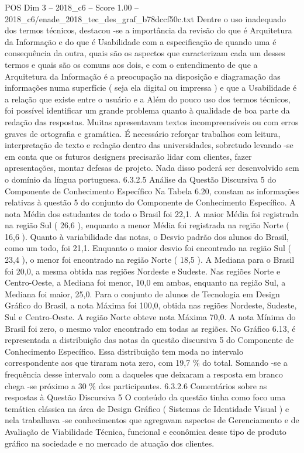 \begin{textsample}{POS Dim 3 – 2018\_c6 – Score 1.00 – 2018\_c6/enade\_2018\_tec\_des\_graf\_b78dccf50c.txt}
Dentre o uso inadequado dos termos técnicos, destacou -se a importância da revisão do que é Arquitetura da Informação e do que é Usabilidade com a especificação de quando uma é consequência da outra, quais são os aspectos que caracterizam cada um desses termos e quais são os comuns aos dois, e com o entendimento de que a Arquitetura da Informação é a preocupação na disposição e diagramação das informações numa superfície ( seja ela digital ou impressa ) e que a Usabilidade é a relação que existe entre o usuário e a Além do pouco uso dos termos técnicos, foi possível identificar um grande problema quanto à qualidade de boa parte da redação das respostas.
Muitas apresentavam textos incompreensíveis ou com erros graves de ortografia e gramática.
É necessário reforçar trabalhos com leitura, interpretação de texto e redação dentro das universidades, sobretudo levando -se em conta que os futuros designers precisarão lidar com clientes, fazer apresentações, montar defesas de projeto.
Nada disso poderá ser desenvolvido sem o domínio da língua portuguesa. 6.3.2.5 Análise da Questão Discursiva 5 do Componente de Conhecimento Específico Na Tabela 6.20, constam as informações relativas à questão 5 do conjunto do Componente de Conhecimento Específico.
A nota Média dos estudantes de todo o Brasil foi 22,1.
A maior Média foi registrada na região Sul ( 26,6 ), enquanto a menor Média foi registrada na região Norte ( 16,6 ).
Quanto à variabilidade das notas, o Desvio padrão dos alunos do Brasil, como um todo, foi 21,1.
Enquanto o maior desvio foi encontrado na região Sul ( 23,4 ), o menor foi encontrado na região Norte ( 18,5 ).
A Mediana para o Brasil foi 20,0, a mesma obtida nas regiões Nordeste e Sudeste.
Nas regiões Norte e Centro-Oeste, a Mediana foi menor, 10,0 em ambas, enquanto na região Sul, a Mediana foi maior, 25,0.
Para o conjunto de alunos de Tecnologia em Design Gráfico do Brasil, a nota Máxima foi 100,0, obtida nas regiões Nordeste, Sudeste, Sul e Centro-Oeste.
A região Norte obteve nota Máxima 70,0.
A nota Mínima do Brasil foi zero, o mesmo valor encontrado em todas as regiões.
No Gráfico 6.13, é representada a distribuição das notas da questão discursiva 5 do Componente de Conhecimento Específico.
Essa distribuição tem moda no intervalo correspondente aos que tiraram nota zero, com 19,7 \% do total.
Somando -se a frequência desse intervalo com a daqueles que deixaram a resposta em branco chega -se próximo a 30 \% dos participantes. 6.3.2.6 Comentários sobre as respostas à Questão Discursiva 5 O conteúdo da questão tinha como foco uma temática clássica na área de Design Gráfico ( Sistemas de Identidade Visual ) e nela trabalhava -se conhecimentos que agregavam aspectos de Gerenciamento e de Avaliação de Viabilidade Técnica, funcional e econômica desse tipo de produto gráfico na sociedade e no mercado de atuação dos clientes.

\end{textsample}
